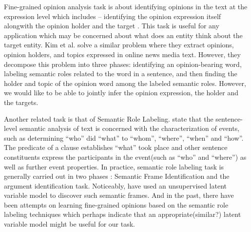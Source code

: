 \documentclass{article}
\begin{document}
 



\label{submission}
Fine-grained opinion analysis task is about identifying opinions in the text at the expression level which includes -- identifying the opinion expression itself alongwith the opinion holder and the target \cite{Wiebe}. This task is useful for any application which may be concerned about what does an entity think about the target entity. Kim et al.\cite{Kim-news} solve a similar problem where they extract opinions, opinion holders, and topics expressed in online news media text. However, they decompose this problem into three phases: identifying an opinion-bearing word, labeling semantic roles related to the word in a sentence, and then finding the holder and topic of the opinion word among the labeled semantic roles. However, we would like to be able to jointly infer the opinion expression, the holder and the targets. 

Another related task is that of Semantic Role Labeling. \cite{Marquez} state that the sentence-level semantic analysis of text is concerned with the characterization of events, such as determining ``who'' did ``what'' to ``whom'', ``where'', ``when'' and ``how''. The predicate of a clause establishes ``what'' took place and other sentence constituents express the participants in the event(such as ``who'' and ``where'') as well as further event properties. In practice, semantic role labeling task is generally carried out in two phases : Semantic Frame Identification and the argument identification task. Noticeably, \cite{Brenden} have used an unsupervised latent variable model to discover such semantic frames. And in the past, there have been attempts on learning fine-grained opinions based on the semantic role labeling techniques which perhaps indicate that an appropriate(similar?) latent variable model might be useful for our task.
\end{document}
